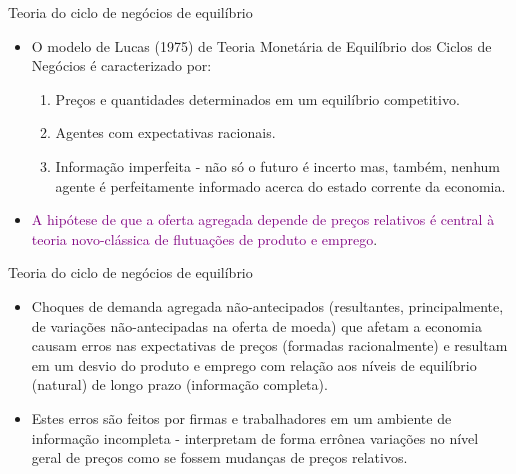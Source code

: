 \documentclass[10pt]{beamer}
\begin{document}
\begin{frame}{Teoria do ciclo de negócios de equilíbrio}
    \begin{itemize}
        \item O modelo de Lucas (1975) de Teoria Monetária de Equilíbrio dos Ciclos de Negócios é caracterizado por:
        \bigskip
        \begin{enumerate}
            \item Preços e quantidades determinados em um equilíbrio competitivo.
            \bigskip
            \item Agentes com expectativas racionais.
            \bigskip
            \item Informação imperfeita - não só o futuro é incerto mas, também, nenhum agente é perfeitamente informado acerca do estado corrente da economia.
        \end{enumerate}
        \bigskip
        \item \textcolor{purple}{A hipótese de que a oferta agregada depende de preços relativos é central à teoria novo-clássica de flutuações de produto e emprego}.
    \end{itemize}
\end{frame}

\begin{frame}{Teoria do ciclo de negócios de equilíbrio}
    \begin{itemize}
        \item Choques de demanda agregada não-antecipados (resultantes, principalmente, de variações não-antecipadas na oferta de moeda) que afetam a economia causam erros nas expectativas de preços (formadas racionalmente) e resultam em um desvio do produto e emprego com relação aos níveis de equilíbrio (natural) de longo prazo (informação completa).
        \bigskip
        \item Estes erros são feitos por firmas e trabalhadores em um ambiente de informação incompleta - interpretam de forma errônea variações no nível geral de preços como se fossem mudanças de preços relativos.
    \end{itemize}
\end{frame}
\end{document}
